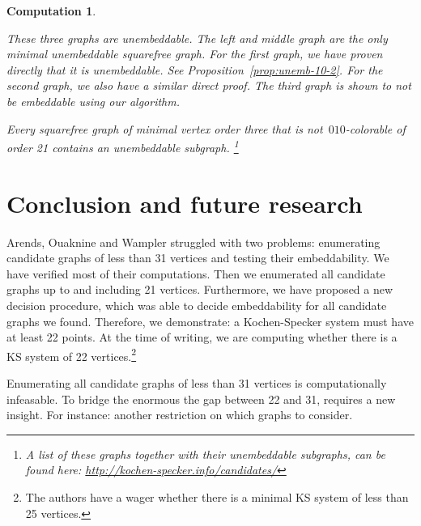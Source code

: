 \documentclass[adraft,copyright,creativecommons]{eptcs}
\newcounter{main}
\newtheorem{comp}[main]{Computation}
\theoremstyle{definition}
\theoremstyle{remark}
\begin{document}
\begin{comp}
\begin{center}
    \end{center}
    These three graphs are unembeddable.  The left and middle graph
    are the only minimal unembeddable squarefree graph.
For the first graph, we have proven directly that it is unembeddable.
See Proposition~\ref{prop:unemb-10-2}.
For the second graph, we also have a similar direct proof. The third graph is shown to not be embeddable using our algorithm.

Every squarefree graph of minimal vertex order three that is
not~$010$-colorable of order 21 contains an unembeddable subgraph.%
\footnote{A list of these graphs together with their unembeddable
subgraphs, can be found here:
\url{http://kochen-specker.info/candidates/}}
\end{comp}

\section{Conclusion and future research}
Arends, Ouaknine and Wampler struggled with two problems:
enumerating candidate graphs of less than 31 vertices
and testing their embeddability.
We have verified most of their computations.
Then we enumerated all candidate graphs
up to and including 21 vertices.
Furthermore, we have proposed a new decision procedure,
which was able to decide embeddability
for all candidate graphs we found.
Therefore, we demonstrate: a Kochen-Specker system must have at least
22 points.
At the time of writing,
we are computing
whether there is a KS system of 22 vertices.\footnote{
The authors have a wager whether there is a minimal KS system of less
than 25 vertices.}

Enumerating all candidate graphs of less than 31 vertices
is computationally infeasable.
To bridge the enormous the gap between 22 and 31,
requires a new insight.
For instance: another restriction on which graphs to consider.
\end{document}
